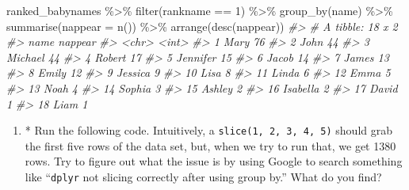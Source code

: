 \documentclass[
]{book}
\newenvironment{Shaded}{\begin{snugshade}}{\end{snugshade}}
\newcommand{\AttributeTok}[1]{\textcolor[rgb]{0.77,0.63,0.00}{#1}}
\newcommand{\CommentTok}[1]{\textcolor[rgb]{0.56,0.35,0.01}{\textit{#1}}}
\newcommand{\DecValTok}[1]{\textcolor[rgb]{0.00,0.00,0.81}{#1}}
\newcommand{\FunctionTok}[1]{\textcolor[rgb]{0.00,0.00,0.00}{#1}}
\newcommand{\NormalTok}[1]{#1}
\newcommand{\SpecialCharTok}[1]{\textcolor[rgb]{0.00,0.00,0.00}{#1}}
\providecommand{\tightlist}{%
  \setlength{\itemsep}{0pt}\setlength{\parskip}{0pt}}
\begin{document}
\begin{Shaded}
\begin{Highlighting}[]
\NormalTok{ranked\_babynames }\SpecialCharTok{\%\textgreater{}\%} \FunctionTok{filter}\NormalTok{(rankname }\SpecialCharTok{==} \DecValTok{1}\NormalTok{) }\SpecialCharTok{\%\textgreater{}\%}
  \FunctionTok{group\_by}\NormalTok{(name) }\SpecialCharTok{\%\textgreater{}\%}
  \FunctionTok{summarise}\NormalTok{(}\AttributeTok{nappear =} \FunctionTok{n}\NormalTok{()) }\SpecialCharTok{\%\textgreater{}\%}
  \FunctionTok{arrange}\NormalTok{(}\FunctionTok{desc}\NormalTok{(nappear))}
\CommentTok{\#\textgreater{} \# A tibble: 18 x 2}
\CommentTok{\#\textgreater{}    name     nappear}
\CommentTok{\#\textgreater{}    \textless{}chr\textgreater{}      \textless{}int\textgreater{}}
\CommentTok{\#\textgreater{}  1 Mary          76}
\CommentTok{\#\textgreater{}  2 John          44}
\CommentTok{\#\textgreater{}  3 Michael       44}
\CommentTok{\#\textgreater{}  4 Robert        17}
\CommentTok{\#\textgreater{}  5 Jennifer      15}
\CommentTok{\#\textgreater{}  6 Jacob         14}
\CommentTok{\#\textgreater{}  7 James         13}
\CommentTok{\#\textgreater{}  8 Emily         12}
\CommentTok{\#\textgreater{}  9 Jessica        9}
\CommentTok{\#\textgreater{} 10 Lisa           8}
\CommentTok{\#\textgreater{} 11 Linda          6}
\CommentTok{\#\textgreater{} 12 Emma           5}
\CommentTok{\#\textgreater{} 13 Noah           4}
\CommentTok{\#\textgreater{} 14 Sophia         3}
\CommentTok{\#\textgreater{} 15 Ashley         2}
\CommentTok{\#\textgreater{} 16 Isabella       2}
\CommentTok{\#\textgreater{} 17 David          1}
\CommentTok{\#\textgreater{} 18 Liam           1}
\end{Highlighting}
\end{Shaded}

\begin{enumerate}
\def\labelenumi{\arabic{enumi}.}
\setcounter{enumi}{5}
\tightlist
\item
  * Run the following code. Intuitively, a \texttt{slice(1,\ 2,\ 3,\ 4,\ 5)} should grab the first five rows of the data set, but, when we try to run that, we get 1380 rows. Try to figure out what the issue is by using Google to search something like ``\texttt{dplyr} not slicing correctly after using group by.'' What do you find?
\end{enumerate}
\end{document}
